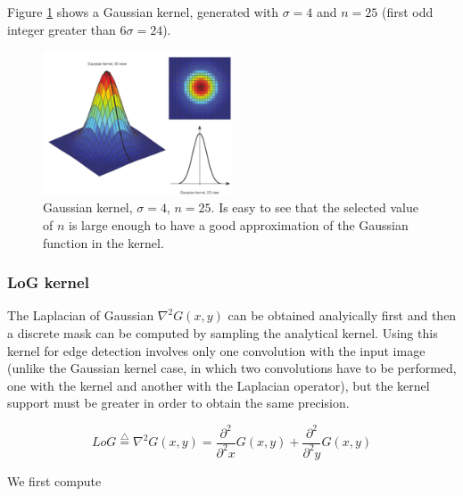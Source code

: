 \documentclass{ipol}
\numberwithin{equation}{section}
\numberwithin{table}{section}
\begin{document}
{Figure \ref{fig:gaussian_kernel} shows a Gaussian kernel, generated with $\sigma = 4$ and $n = 25$ 
(first odd integer greater than $6\sigma=24$).

\begin{figure}
	\centering
	\includegraphics[width=0.5\textwidth]{kernel_gaussian.pdf}
	\caption{Gaussian kernel, $\sigma=4$, $n=25$. Is easy to see that the selected value of $n$ is 
large enough to have a good approximation of the Gaussian function in the kernel.}
	\label{fig:gaussian_kernel}
\end{figure}


\subsubsection{LoG kernel}

The Laplacian of Gaussian $\nabla^2G(x,y)$ can be obtained analyically first and then a discrete mask 
can be computed by sampling the analytical kernel. Using this kernel for edge detection involves only 
one convolution with the input image (unlike the Gaussian kernel case, in which two convolutions 
have to be performed, one with the kernel and another with the Laplacian operator), but the kernel 
support must be greater in order to obtain the same precision.


\begin{equation}
	LoG \stackrel{\triangle}{=}\nabla^2G(x,y)=\frac{\partial^2}{\partial^2 x}G(x,y) + \frac{\partial^2}{\partial^2 y}G(x,y)
\end{equation}

We first compute

}
\end{document}
